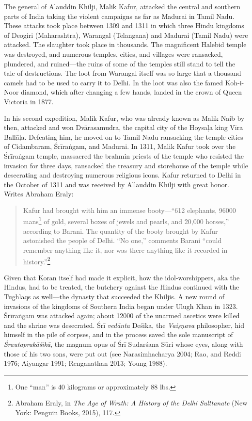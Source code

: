 The general of Alauddin Khilji, Malik Kafur, attacked the central and southern parts of India taking the violent campaigns as far as Madurai in Tamil Nadu. These attacks took place between 1309 and 1311 in which three Hindu kingdoms of Deogiri (Maharashtra), Warangal (Telangana) and Madurai (Tamil Nadu) were attacked. The slaughter took place in thousands. The magnificent Halebid temple was destroyed, and numerous temples, cities, and villages were ransacked, plundered, and ruined—the ruins of some of the temples still stand to tell the tale of destructions. The loot from Warangal itself was so large that a thousand camels had to be used to carry it to Delhi. In the loot was also the famed Koh-i-Noor diamond, which after changing a few hands, landed in the crown of Queen Victoria in 1877.

In his second expedition, Malik Kafur, who was already known as Malik Naib by then, attacked and won Dvārasamudra, the capital city of the Hoysaḷa king Vīra Ballāḷa. Defeating him, he moved on to Tamil Nadu ransacking the temple cities of Cidambaram, Śrīraṅgam, and Madurai. In 1311, Malik Kafur took over the Śrīraṅgam temple, massacred the brahmin priests of the temple who resisted the invasion for three days, ransacked the treasury and storehouse of the temple while desecrating and destroying numerous religious icons. Kafur returned to Delhi in the October of 1311 and was received by Allauddin Khilji with great honor. Writes Abraham Eraly:
\begin{quote}
Kafur had brought with him an immense booty—“612 elephants, 96000 mans\footnote{One “man” is 40 kilograms or approximately 88 lbs.} of gold, several boxes of jewels and pearls, and 20,000 horses,” according to Barani. The quantity of the booty brought by Kafur astonished the people of Delhi. “No one,” comments Barani “could remember anything like it, nor was there anything like it recorded in history.”\footnote{Abraham Eraly, in \textit{The Age of Wrath: A History of the Delhi Sulttanate} (New York: Penguin Books, 2015), 117.}
\end{quote}
Given that Koran itself had made it explicit, how the idol-worshippers, aka the Hindus, had to be treated, the butchery against the Hindus continued with the Tughlaqs as well—the dynasty that succeeded the Khiljis. A new round of invasions of the kingdoms of Southern India began under Ulugh Khan in 1323. Śrīraṅgam was attacked again; about 12000 of the unarmed ascetics were killed and the shrine was desecrated. Śrī \textit{vedānta} Deśika, the \textit{Vaiṣṇava} philosopher, hid himself in the pile of corpses, and in the process saved the sole manuscript of \textit{Śrautaprakāśikā}, the magnum opus of Śrī Sudarśana Sūri whose eyes, along with those of his two sons, were put out (see Narasimhacharya 2004; Rao, and Reddi 1976; Aiyangar 1991; Renganathan 2013; Young 1988). 

